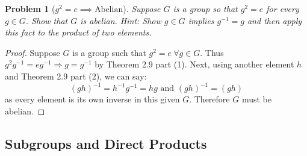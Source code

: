 \documentclass[12pt]{article}
\newtheorem{problem}{Problem}
\numberwithin{problem}{section} %
\theoremstyle{remark}  %
\newenvironment{answer}
    {\begin{adjustwidth}{0pt}{0pt}}
    {\end{adjustwidth}}
\begin{document}
\setcounter{problem}{44}
    \begin{problem}[$g^2=e\implies\text{Abelian}$]
        Suppose $G$ is a group so that $g^2=e$ for every $g\in G$. Show that $G$ is abelian. Hint: Show $g\in G$ implies $g^{-1}=g$ and then apply this fact to the product of two elements.
    \end{problem}
    \begin{answer}
        \begin{proof}
            Suppose $G$ is a group such that $g^2=e\ \forall g\in G$. Thus $g^2g^{-1}=eg^{-1}\Rightarrow g = g^{-1}$ by Theorem 2.9 part (1). Next, using another element $h$ and Theorem 2.9 part (2), we can say: $$
                (gh)^{-1} = h^{-1}g^{-1} = hg \text{ and } (gh)^{-1} = (gh)
            $$ as every element is its own inverse in this given $G$. Therefore $G$ must be abelian.
        \end{proof}
    \end{answer}


\subsection{Subgroups and Direct Products}
\end{document}
